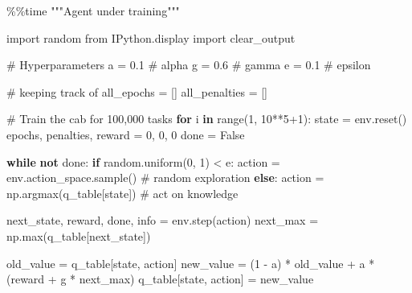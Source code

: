 \documentclass[
  letterpaper,
]{scrbook}
\newenvironment{Shaded}{\begin{snugshade}}{\end{snugshade}}
\newcommand{\BuiltInTok}[1]{\textcolor[rgb]{0.00,0.23,0.31}{#1}}
\newcommand{\CommentTok}[1]{\textcolor[rgb]{0.37,0.37,0.37}{#1}}
\newcommand{\ControlFlowTok}[1]{\textcolor[rgb]{0.00,0.23,0.31}{\textbf{#1}}}
\newcommand{\DecValTok}[1]{\textcolor[rgb]{0.68,0.00,0.00}{#1}}
\newcommand{\FloatTok}[1]{\textcolor[rgb]{0.68,0.00,0.00}{#1}}
\newcommand{\ImportTok}[1]{\textcolor[rgb]{0.00,0.46,0.62}{#1}}
\newcommand{\KeywordTok}[1]{\textcolor[rgb]{0.00,0.23,0.31}{\textbf{#1}}}
\newcommand{\NormalTok}[1]{\textcolor[rgb]{0.00,0.23,0.31}{#1}}
\newcommand{\OperatorTok}[1]{\textcolor[rgb]{0.37,0.37,0.37}{#1}}
\newcommand{\VariableTok}[1]{\textcolor[rgb]{0.07,0.07,0.07}{#1}}
\begin{document}
\begin{Shaded}
\begin{Highlighting}[]
\OperatorTok{\%\%}\NormalTok{time}
\CommentTok{"""Agent under training"""}

\ImportTok{import}\NormalTok{ random}
\ImportTok{from}\NormalTok{ IPython.display }\ImportTok{import}\NormalTok{ clear\_output}

\CommentTok{\# Hyperparameters}
\NormalTok{a }\OperatorTok{=} \FloatTok{0.1} \CommentTok{\# alpha}
\NormalTok{g }\OperatorTok{=} \FloatTok{0.6} \CommentTok{\# gamma}
\NormalTok{e }\OperatorTok{=} \FloatTok{0.1} \CommentTok{\# epsilon}

\CommentTok{\# keeping track of}
\NormalTok{all\_epochs }\OperatorTok{=}\NormalTok{ []}
\NormalTok{all\_penalties }\OperatorTok{=}\NormalTok{ []}

\CommentTok{\# Train the cab for 100,000 tasks}
\ControlFlowTok{for}\NormalTok{ i }\KeywordTok{in} \BuiltInTok{range}\NormalTok{(}\DecValTok{1}\NormalTok{, }\DecValTok{10}\OperatorTok{**}\DecValTok{5}\OperatorTok{+}\DecValTok{1}\NormalTok{):}
\NormalTok{    state }\OperatorTok{=}\NormalTok{ env.reset()}
\NormalTok{    epochs, penalties, reward }\OperatorTok{=} \DecValTok{0}\NormalTok{, }\DecValTok{0}\NormalTok{, }\DecValTok{0}
\NormalTok{    done }\OperatorTok{=} \VariableTok{False}
    
    \ControlFlowTok{while} \KeywordTok{not}\NormalTok{ done: }
        \ControlFlowTok{if}\NormalTok{ random.uniform(}\DecValTok{0}\NormalTok{, }\DecValTok{1}\NormalTok{) }\OperatorTok{\textless{}}\NormalTok{ e: }
\NormalTok{            action }\OperatorTok{=}\NormalTok{ env.action\_space.sample() }\CommentTok{\# random exploration}
        \ControlFlowTok{else}\NormalTok{: }
\NormalTok{            action }\OperatorTok{=}\NormalTok{ np.argmax(q\_table[state]) }\CommentTok{\# act on knowledge}
        
\NormalTok{        next\_state, reward, done, info }\OperatorTok{=}\NormalTok{ env.step(action)}
\NormalTok{        next\_max }\OperatorTok{=}\NormalTok{ np.}\BuiltInTok{max}\NormalTok{(q\_table[next\_state])}
        
\NormalTok{        old\_value }\OperatorTok{=}\NormalTok{ q\_table[state, action]}
\NormalTok{        new\_value }\OperatorTok{=}\NormalTok{ (}\DecValTok{1} \OperatorTok{{-}}\NormalTok{ a) }\OperatorTok{*}\NormalTok{ old\_value }\OperatorTok{+}\NormalTok{ a }\OperatorTok{*}\NormalTok{ (reward }\OperatorTok{+}\NormalTok{ g }\OperatorTok{*}\NormalTok{ next\_max)}
\NormalTok{        q\_table[state, action] }\OperatorTok{=}\NormalTok{ new\_value}
        

\end{Highlighting}
\end{Shaded}
\end{document}
